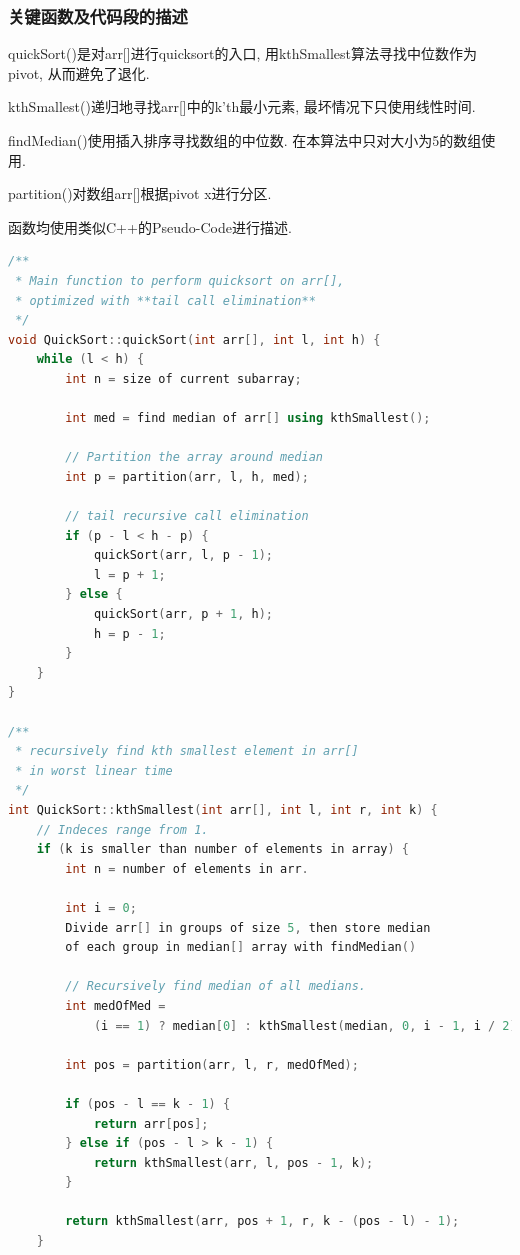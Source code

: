 \subsubsection{关键函数及代码段的描述}
quickSort()是对arr[]进行quicksort的入口, 用kthSmallest算法寻找中位数作为
pivot, 从而避免了退化.\par
kthSmallest()递归地寻找arr[]中的k'th最小元素, 最坏情况下只使用线性时间.\par
findMedian()使用插入排序寻找数组的中位数. 在本算法中只对大小为5的数组使用.\par
partition()对数组arr[]根据pivot x进行分区.\par
函数均使用类似C++的Pseudo-Code进行描述.
\begin{lstlisting}[language=c++]
/**
 * Main function to perform quicksort on arr[],
 * optimized with **tail call elimination**
 */
void QuickSort::quickSort(int arr[], int l, int h) {
    while (l < h) {
        int n = size of current subarray;

        int med = find median of arr[] using kthSmallest();

        // Partition the array around median
        int p = partition(arr, l, h, med);

        // tail recursive call elimination
        if (p - l < h - p) {
            quickSort(arr, l, p - 1);
            l = p + 1;
        } else {
            quickSort(arr, p + 1, h);
            h = p - 1;
        }
    }
}

/**
 * recursively find kth smallest element in arr[]
 * in worst linear time
 */
int QuickSort::kthSmallest(int arr[], int l, int r, int k) {
    // Indeces range from 1.
    if (k is smaller than number of elements in array) {
        int n = number of elements in arr.

        int i = 0;
        Divide arr[] in groups of size 5, then store median
        of each group in median[] array with findMedian()

        // Recursively find median of all medians.
        int medOfMed =
            (i == 1) ? median[0] : kthSmallest(median, 0, i - 1, i / 2);

        int pos = partition(arr, l, r, medOfMed);

        if (pos - l == k - 1) {
            return arr[pos];
        } else if (pos - l > k - 1) {
            return kthSmallest(arr, l, pos - 1, k);
        }

        return kthSmallest(arr, pos + 1, r, k - (pos - l) - 1);
    }


\end{lstlisting}

